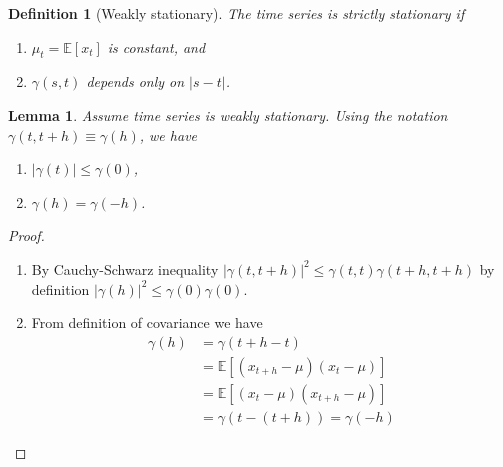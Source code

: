 \documentclass[10pt]{article}
\theoremstyle{remark}
\theoremstyle{plain}
\newtheorem{Lemma}{Lemma}[section]
\newtheorem{Definition}{Definition}[section]
\numberwithin{equation}{section}
\renewcommand{\leq}{\leqslant}
\begin{document}
\begin{Definition}[Weakly stationary]
	The time series is strictly stationary if
	\begin{enumerate}
		\item $\mu_t = \mathds{E}[x_t]$ is constant, and
		
		\item $\gamma(s,t)$ depends only on $|s-t|$. 
	\end{enumerate}
\end{Definition}


\begin{Lemma}
	Assume time series is weakly stationary. Using the notation $\gamma (t, t+h) \equiv \gamma (h)$, we have
	\begin{enumerate}
		\item $|\gamma (t)| \leq \gamma(0)$,
		
		\item $\gamma(h) = \gamma(-h)$.
	\end{enumerate}
\end{Lemma}

\begin{proof}
	\begin{enumerate}
		\item By Cauchy-Schwarz inequality $|\gamma (t, t+h)|^2 \leq \gamma(t,t) \gamma(t+h,t+h)$ by definition $|\gamma(h)|^2 \leq \gamma(0) \gamma(0)$.
		
		\item From definition of covariance we have
		\begin{align*} 
			\gamma(h) &= \gamma(t+h-t)\\
			& = \mathds{E}\left[(x_{t+h}-\mu)(x_t - \mu)\right]\\
			& = \mathds{E}\left[(x_t - \mu)(x_{t+h}-\mu)\right]\\
			& = \gamma(t-(t+h)) = \gamma(-h)
		\end{align*}
	\end{enumerate}
\end{proof}
\end{document}
